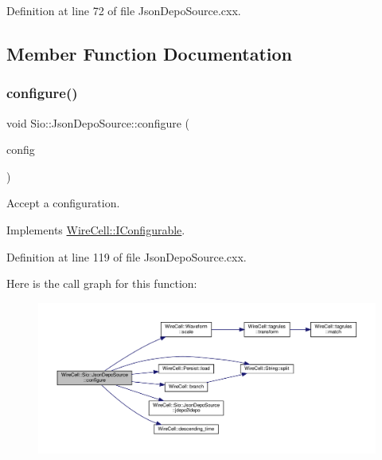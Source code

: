 Definition at line 72 of file Json\+Depo\+Source.\+cxx.



\subsection{Member Function Documentation}
\mbox{\label{class_wire_cell_1_1_sio_1_1_json_depo_source_abc06840de469269082caee8f8c2369e0}} 
\subsubsection{\texorpdfstring{configure()}{configure()}}
{\footnotesize\ttfamily void Sio\+::\+Json\+Depo\+Source\+::configure (\begin{DoxyParamCaption}\item[{const \hyperlink{namespace_wire_cell_a9f705541fc1d46c608b3d32c182333ee}{Wire\+Cell\+::\+Configuration} \&}]{config }\end{DoxyParamCaption})\hspace{0.3cm}{\ttfamily [virtual]}}



Accept a configuration. 



Implements \hyperlink{class_wire_cell_1_1_i_configurable_a57ff687923a724093df3de59c6ff237d}{Wire\+Cell\+::\+I\+Configurable}.



Definition at line 119 of file Json\+Depo\+Source.\+cxx.

Here is the call graph for this function\+:
\nopagebreak
\begin{figure}[H]
\begin{center}
\leavevmode
\includegraphics[width=350pt]{class_wire_cell_1_1_sio_1_1_json_depo_source_abc06840de469269082caee8f8c2369e0_cgraph}
\end{center}
\end{figure}
\mbox{\label{class_wire_cell_1_1_sio_1_1_json_depo_source_a55e01822b3d36efed095e8e829633d4d}} 
